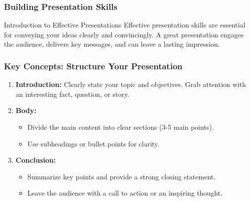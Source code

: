 \documentclass[aspectratio=169]{beamer}
\begin{document}
\begin{frame}[fragile]
    \frametitle{Building Presentation Skills}
    
    \begin{block}{Introduction to Effective Presentations}
        Effective presentation skills are essential for conveying your ideas clearly and convincingly. A great presentation engages the audience, delivers key messages, and can leave a lasting impression.
    \end{block}
\end{frame}

\begin{frame}[fragile]
    \frametitle{Key Concepts: Structure Your Presentation}
    
    \begin{enumerate}
        \item \textbf{Introduction:} Clearly state your topic and objectives. Grab attention with an interesting fact, question, or story.
        
        \item \textbf{Body:} 
        \begin{itemize}
            \item Divide the main content into clear sections (3-5 main points).
            \item Use subheadings or bullet points for clarity.
        \end{itemize}
        
        \item \textbf{Conclusion:} 
        \begin{itemize}
            \item Summarize key points and provide a strong closing statement.
            \item Leave the audience with a call to action or an inspiring thought.
        \end{itemize}
    \end{enumerate}
\end{frame}
\end{document}
